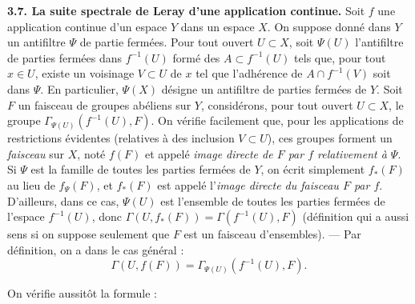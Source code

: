 \indent\textbf{3.7. La suite spectrale de Leray d'une application continue.} Soit
$f$ une application continue d'un espace $Y$ dans un espace $X$.
On suppose donné dans $Y$ un antifiltre $\Psi$ de partie fermées. Pour tout
ouvert $U\subset X$, soit $\Psi(U)$ l'antifiltre de parties fermées dans
$f^{-1}(U)$ formé des $A\subset f^{-1}(U)$ tels que, pour tout $x\in U$,
existe un voisinage $V\subset U$ de $x$ tel que l'adhérence de
$A\cap f^{-1}(V)$ soit dans $\Psi$. En particulier, $\Psi(X)$ désigne un
antifiltre de parties fermées de $Y$.
Soit $F$ un faisceau de groupes abéliens sur $Y$, considérons, pour tout ouvert
$U\subset X$, le groupe $\Gamma_{\Psi(U)}(f^{-1}(U),F)$. On vérifie facilement
que, pour les applications de restrictions évidentes (relatives à des
inclusion $V\subset U$), ces groupes forment un \textit{faisceau} sur $X$, noté
$f(F)$ et appelé \textit{image directe de $F$ par $f$ relativement à
$\Psi$}.
Si $\Psi$ est la famille de toutes les parties fermées de $Y$, on écrit
simplement $f_*(F)$ au lieu de $f_\Psi(F)$, et $f_*(F)$ est appelé
l'\textit{image directe du faisceau $F$ par $f$}. D'ailleurs, dans ce cas,
$\Psi(U)$ est l'ensemble de toutes les parties fermées de l'espace
$f^{-1}(U)$, donc
$\Gamma(U,f_*(F))=\Gamma(f^{-1}(U),F)$
(définition qui a aussi sens si on suppose seulement que $F$ est un faisceau
d'ensembles). --- Par définition, on a dans le cas général :
\[
\Gamma(U,f(F))=\Gamma_{\Psi(U)}(f^{-1}(U),F).
\]

On vérifie aussitôt la formule :

